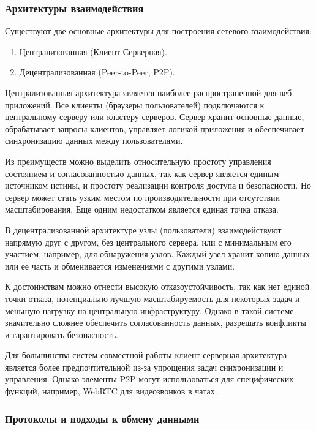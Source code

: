 \subsubsection{Архитектуры взаимодействия}

Существуют две основные архитектуры для построения сетевого взаимодействия:
\begin{enumerate}[wide=12.5mm, leftmargin=12.5mm]
    \item Централизованная (Клиент-Серверная).
    \item Децентрализованная (Peer-to-Peer, P2P).
\end{enumerate}

Централизованная архитектура является наиболее распространенной для веб-приложений. 
Все клиенты (браузеры пользователей) подключаются к центральному серверу или кластеру серверов. 
Сервер хранит основные данные, обрабатывает запросы клиентов, управляет логикой приложения и обеспечивает синхронизацию данных между пользователями.

Из преимуществ можно выделить относительную простоту управления состоянием и согласованностью данных, так как сервер является единым источником истины, и простоту реализации контроля доступа и безопасности.
Но сервер может стать узким местом по производительности при отсутствии масштабирования. 
Еще одним недостатком является единая точка отказа.

В децентрализованной архитектуре узлы (пользователи) взаимодействуют напрямую друг с другом, без центрального сервера, или с минимальным его участием, например, для обнаружения узлов. 
Каждый узел хранит копию данных или ее часть и обменивается изменениями с другими узлами.

К достоинствам можно отнести высокую отказоустойчивость, так как нет единой точки отказа, потенциально лучшую масштабируемость для некоторых задач и меньшую нагрузку на центральную инфраструктуру.
Однако в такой системе значительно сложнее обеспечить согласованность данных, разрешать конфликты и гарантировать безопасность. 

Для большинства систем совместной работы клиент-серверная архитектура является более предпочтительной из-за упрощения задач синхронизации и управления. 
Однако элементы P2P могут использоваться для специфических функций, например, WebRTC для видеозвонков в чатах.

\subsubsection{Протоколы и подходы к обмену данными}

